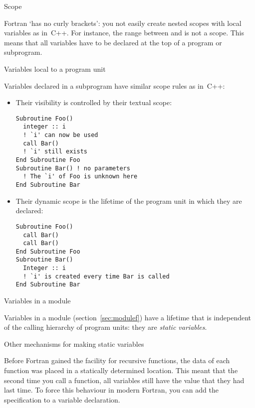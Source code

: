 
 {Scope}

Fortran `has no curly brackets': you not easily create nested
scopes with local variables as in~C++.
For instance, the range between  and  is not a scope.
This means that all variables have to be declared at the top of a
program or subprogram.

 {Variables local to a program unit}

Variables declared in a subprogram have similar scope rules as in~C++:
\begin{itemize}
\item Their visibility is controlled by their textual scope:
\begin{verbatim}
Subroutine Foo()
  integer :: i
  ! `i' can now be used
  call Bar()
  ! `i' still exists
End Subroutine Foo
Subroutine Bar() ! no parameters
  ! The `i' of Foo is unknown here
End Subroutine Bar
\end{verbatim}
\item Their dynamic scope is the lifetime of the program unit in which
  they are declared:
\begin{verbatim}
Subroutine Foo()
  call Bar()
  call Bar()
End Subroutine Foo
Subroutine Bar()
  Integer :: i
  ! `i' is created every time Bar is called
End Subroutine Bar
\end{verbatim}
\end{itemize}

 {Variables in a module}

Variables in a module (section~\ref{sec:modulef}) have a lifetime that
is independent of the calling hierarchy of program units: they are
\emph{static variables}.

 {Other mechanisms for making static variables}

Before Fortran gained the facility for recursive functions, the data
of each function was placed in a statically determined location. This
meant that the second time you call a function, all variables still
have the value that they had last time. To force this behaviour
in modern Fortran, you can add the  specification
to a variable declaration.

